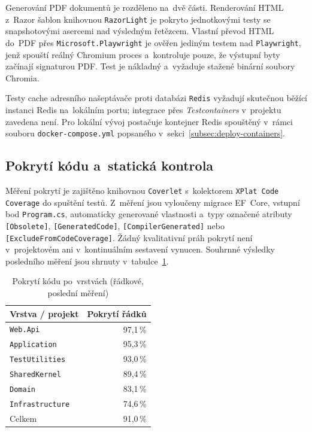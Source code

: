 Generování PDF dokumentů je rozděleno na~dvě části.
Renderování HTML z~Razor šablon knihovnou \texttt{RazorLight} je pokryto jednotkovými testy se snapshotovými asercemi nad výsledným řetězcem.
Vlastní převod HTML do~PDF přes \texttt{Microsoft.Playwright} je ověřen jediným  testem nad \texttt{Playwright}, jenž spouští reálný Chromium proces a~kontroluje pouze, že výstupní byty začínají signaturou PDF.
Test je nákladný a~vyžaduje stažené binární soubory Chromia.

Testy cache adresního našeptávače proti databázi \texttt{Redis} vyžadují skutečnou běžící instanci Redis na~lokálním portu; integrace přes \emph{Testcontainers} v~projektu zavedena není.
Pro lokální vývoj postačuje kontejner Redis spouštěný v~rámci souboru \texttt{docker-compose.yml} popsaného v~sekci~\ref{subsec:deploy-containers}.

\subsection{Pokrytí kódu a~statická kontrola}
\label{subsec:test-coverage}

Měření pokrytí je zajištěno knihovnou \texttt{Coverlet} s~kolektorem \texttt{XPlat Code Coverage} do spuštění testů.
Z~měření jsou vyloučeny migrace EF~Core, vstupní bod \texttt{Program.cs}, automaticky generované vlastnosti a~typy označené atributy \texttt{[Obsolete]}, \texttt{[GeneratedCode]}, \texttt{[CompilerGenerated]} nebo \texttt{[ExcludeFromCodeCoverage]}.
Žádný kvalitativní práh pokrytí není v~projektovém ani v~kontinuálním sestavení vynucen.
Souhrnné výsledky posledního měření jsou shrnuty v~tabulce~\ref{tab:coverage}.

\begin{table}[h]
\centering
\caption{Pokrytí kódu po~vrstvách (řádkové, poslední měření)}
\label{tab:coverage}
\begin{tabular}{lr}
\toprule
Vrstva / projekt & Pokrytí řádků \\
\midrule
\texttt{Web.Api}        & 97{,}1\,\% \\
\texttt{Application}    & 95{,}3\,\% \\
\texttt{TestUtilities}  & 93{,}0\,\% \\
\texttt{SharedKernel}   & 89{,}4\,\% \\
\texttt{Domain}         & 83{,}1\,\% \\
\texttt{Infrastructure} & 74{,}6\,\% \\
\midrule
Celkem                  & 91{,}0\,\% \\
\bottomrule
\end{tabular}
\end{table}

